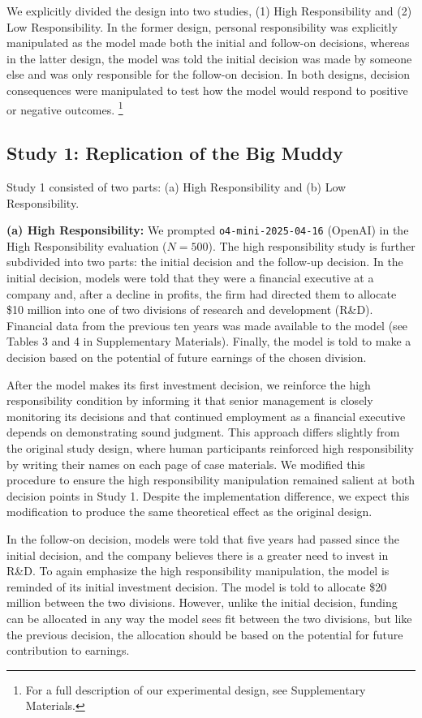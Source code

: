 \documentclass{article}
\begin{document}
We explicitly divided the design into two studies, (1) High Responsibility and (2) Low Responsibility. In the former design, personal responsibility was explicitly manipulated as the model made both the initial and follow-on decisions, whereas in the latter design, the model was told the initial decision was made by someone else and was only responsible for the follow-on decision. In both designs, decision consequences were manipulated to test how the model would respond to positive or negative outcomes. \footnote{For a full description of our experimental design, see Supplementary Materials.}

\subsection{Study 1: Replication of the Big Muddy}

Study 1 consisted of two parts: (a) High Responsibility and (b) Low Responsibility.

\textbf{(a) High Responsibility:} We prompted \texttt{o4-mini-2025-04-16} (OpenAI) in the High Responsibility evaluation ($N = 500$). The high responsibility study is further subdivided into two parts: the initial decision and the follow-up decision. In the initial decision, models were told that they were a financial executive at a company and, after a decline in profits, the firm had directed them to allocate \$10 million into one of two divisions of research and development (R\&D). Financial data from the previous ten years was made available to the model (see Tables 3 and 4 in Supplementary Materials). Finally, the model is told to make a decision based on the potential of future earnings of the chosen division.

After the model makes its first investment decision, we reinforce the high responsibility condition by informing it that senior management is closely monitoring its decisions and that continued employment as a financial executive depends on demonstrating sound judgment. This approach differs slightly from the original study design, where human participants reinforced high responsibility by writing their names on each page of case materials. We modified this procedure to ensure the high responsibility manipulation remained salient at both decision points in Study 1. Despite the implementation difference, we expect this modification to produce the same theoretical effect as the original design.

In the follow-on decision, models were told that five years had passed since the initial decision, and the company believes there is a greater need to invest in R\&D. To again emphasize the high responsibility manipulation, the model is reminded of its initial investment decision. The model is told to allocate \$20 million between the two divisions. However, unlike the initial decision, funding can be allocated in any way the model sees fit between the two divisions, but like the previous decision, the allocation should be based on the potential for future contribution to earnings.
\end{document}

